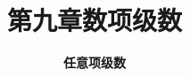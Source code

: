 


\title[数学分析]{\texorpdfstring{\LARGE \bfseries 第九章\quad 数项级数}{第九章 数项级数}} %
\author[任意项级数] %
{\Large \bfseries 任意项级数}
\date{}





\begin{frame}

\titlepage %

\end{frame}





